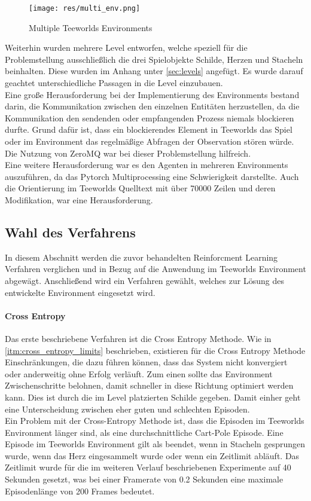 \documentclass[11pt]{scrartcl}
\begin{document}
\begin{figure}[htp]
  \centering
  \texttt{[image: res/multi\_env.png]}
  \caption{Multiple Teeworlds Environments}
  \label{fig:multi_env}
\end{figure}
\noindent
Weiterhin wurden mehrere Level entworfen, welche speziell für die Problemstellung
ausschließlich die drei Spielobjekte Schilde, Herzen und Stacheln beinhalten. Diese
wurden im Anhang unter \ref{sec:levels} angefügt. Es wurde darauf geachtet
unterschiedliche Passagen in die Level einzubauen.\\
Eine große Herausforderung bei der Implementierung des Environments bestand darin, die
Kommunikation zwischen den einzelnen Entitäten herzustellen, da die Kommunikation den
sendenden oder empfangenden Prozess niemals blockieren durfte. Grund dafür ist, dass
ein blockierendes Element in Teeworlds das Spiel oder im Environment das regelmäßige
Abfragen der Observation stören würde. Die Nutzung von ZeroMQ war bei dieser
Problemstellung hilfreich.\\ %
Eine weitere Herausforderung war es den Agenten in mehreren Environments auszuführen, da
das Pytorch Multiprocessing eine Schwierigkeit darstellte. Auch die Orientierung im
Teeworlds Quelltext mit über 70000 Zeilen und deren Modifikation, war eine %
Herausforderung.

\subsection{Wahl des Verfahrens}
In diesem Abschnitt werden die zuvor behandelten Reinforcment Learning Verfahren verglichen
und in Bezug auf die Anwendung im Teeworlds Environment abgewägt. Anschließend wird ein
Verfahren gewählt, welches zur Lösung des entwickelte Environment eingesetzt wird.\\

\paragraph{Cross Entropy}
Das erste beschriebene Verfahren ist die Cross Entropy Methode. Wie in
\autoref{itm:cross_entropy_limits} beschrieben, existieren für die Cross Entropy Methode
Einschränkungen, die dazu führen können, dass das System nicht konvergiert oder anderweitig
ohne Erfolg verläuft. Zum einen
sollte das Environment Zwischenschritte belohnen, damit schneller in diese Richtung
optimiert werden kann. Dies ist durch die im Level platzierten Schilde gegeben. Damit
einher geht eine Unterscheidung zwischen eher guten und schlechten Episoden.\\
Ein Problem mit der Cross-Entropy Methode ist, dass die Episoden im Teeworlds Environment
länger sind, als eine durchschnittliche Cart-Pole Episode. Eine Episode im Teeworlds
Environment gilt als beendet, wenn in Stacheln gesprungen wurde, wenn das Herz
eingesammelt wurde oder wenn ein Zeitlimit abläuft. Das Zeitlimit wurde für die im
weiteren Verlauf beschriebenen Experimente auf 40 Sekunden gesetzt, was bei einer
Framerate von 0.2 Sekunden eine maximale Episodenlänge von 200 Frames bedeutet.
\end{document}

